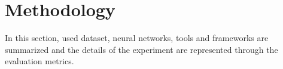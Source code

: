 \chapter{Methodology}
\thispagestyle{empty}

    In this section, used dataset, neural networks, tools and frameworks are summarized and the details of the experiment are represented through the evaluation metrics.

    

    

    

    

    
